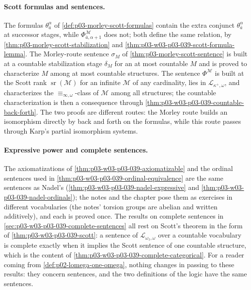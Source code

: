 \paragraph{Scott formulas and sentences.} The formulas
\(\theta^\alpha_{\bar a}\) of \cref{def:p03-morley-scott-formulas} contain
the extra conjunct \(\theta^\alpha_{\bar a}\) at successor stages, while
\(\Phi^{\mathcal M}_{\bar a,\alpha+1}\) does not; both define the same
relation, by \cref{thm:p03-morley-scott-stabilization} and
\cref{thm:p03-w03-p03-039-scott-formula-lemma}. The Morley-route sentence
\(\sigma_M\) of \cref{thm:p03-morley-scott-sentence} is built at a countable
stabilization stage \(\delta_M\) for an at most countable \(M\) and is
proved to characterize \(M\) among at most countable structures. The
sentence \(\Phi^{\mathcal M}\) is built at the Scott rank
\(\operatorname{sr}(\mathcal M)\) for an infinite \(\mathcal M\) of any
cardinality, lies in \(\mathcal L_{\kappa^+,\omega}\), and characterizes the
\(\equiv_{\infty,\omega}\)-class of \(\mathcal M\) among all structures; the
countable characterization is then a consequence through
\cref{thm:p03-w03-p03-039-countable-back-forth}. The two proofs are
different routes: the Morley route builds an isomorphism directly by back
and forth on the formulas, while this route passes through Karp's partial
isomorphism systems.

\paragraph{Expressive power and complete sentences.} The axiomatizations of
\cref{thm:p03-w03-p03-039-axiomatizable} and the ordinal sentences used in
\cref{thm:p03-w03-p03-039-ordinal-equivalence} are the same sentences as
Nadel's (\cref{thm:p03-w03-p03-039-nadel-expressive} and
\cref{thm:p03-w03-p03-039-nadel-ordinals}); the notes and the chapter pose
them as exercises in different vocabularies (the notes' torsion groups are
abelian and written additively), and each is proved once. The results on
complete sentences in \cref{sec:p03-w03-p03-039-complete-sentences} all rest
on Scott's theorem in the form of \cref{thm:p03-w03-p03-039-scott}: a
sentence of \(\mathcal L_{\omega_1,\omega}\) over a countable vocabulary is
complete exactly when it implies the Scott sentence of one countable
structure, which is the content of
\cref{thm:p03-w03-p03-039-complete-categorical}. For a reader coming from
\cref{def:p02-lomega-one-omega}, nothing changes in passing to these results:
they concern sentences, and the two definitions of the logic have the same
sentences.

